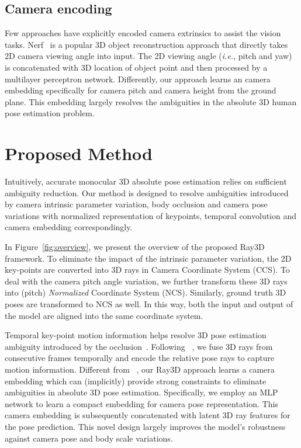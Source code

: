 \documentclass[10pt,twocolumn,letterpaper]{article}
\def\ie{\emph{i.e.}}
\begin{document}
\noindent\subsection{Camera encoding} 
Few approaches have explicitly encoded camera extrinsics to assist the vision tasks. Nerf~\cite{nerf,pixelnerf2021yu,mvsnerf} is a popular 3D object reconstruction approach that directly takes 2D camera viewing angle into input. The 2D viewing angle (\ie, pitch and yaw) is concatenated with 3D location of object point and then processed by a multilayer perceptron network. Differently, our approach learns an camera embedding specifically for camera pitch and camera height from the ground plane. This embedding largely resolves the ambiguities in the absolute 3D human pose estimation problem. 

\section{Proposed Method}

Intuitively, accurate monocular 3D absolute pose estimation relies on sufficient ambiguity reduction. Our method is designed to resolve ambiguities introduced by camera intrinsic parameter variation, body occlusion and camera pose variations with normalized representation of keypoints, temporal convolution and camera embedding correspondingly. 

In Figure~\ref{fig:overview}, we present the overview of the proposed Ray3D framework. To eliminate the impact of the intrinsic parameter variation, the 2D key-points are converted into 3D rays in Camera Coordinate System (CCS). To deal with the camera pitch angle variation, we further transform these 3D rays into (pitch) \emph{Normalized} Coordinate System (NCS). Similarly, ground truth 3D poses are transformed to NCS as well. In this way, both the input and output of the model are aligned into the same coordinate system. 

Temporal key-point motion information helps resolve 3D pose estimation ambiguity introduced by the occlusion~\cite{dario2019videopose,wenkang2021improving}. Following ~\cite{wenkang2021improving}, we fuse 3D rays from consecutive frames temporally and encode the relative pose rays to capture motion information. Different from ~\cite{wenkang2021improving}, our Ray3D approach learns a camera embedding which can (implicitly) provide strong constraints to eliminate ambiguities in absolute 3D pose estimation. Specifically, we employ an MLP network to learn a compact embedding for camera pose representation. This camera embedding is subsequently concatenated with latent 3D ray features for the pose prediction. This novel design largely improves the model's robustness against camera pose and body scale variations.
\end{document}

